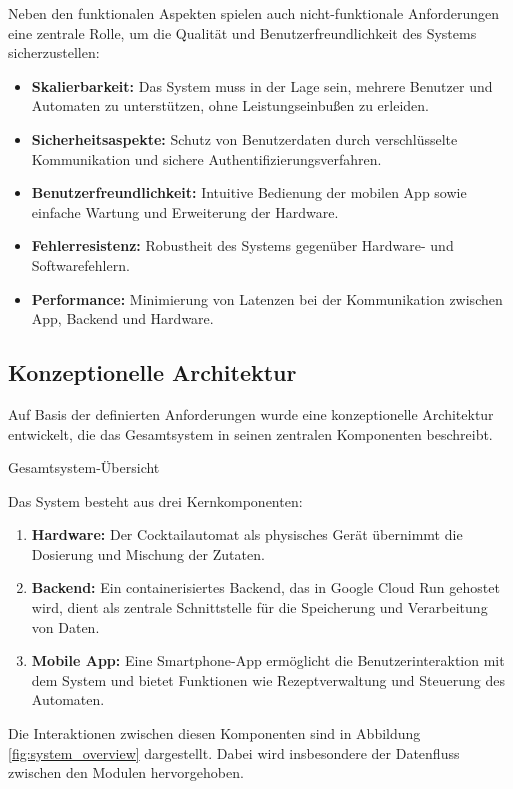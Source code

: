 Neben den funktionalen Aspekten spielen auch nicht-funktionale Anforderungen eine zentrale Rolle, 
um die Qualität und Benutzerfreundlichkeit des Systems sicherzustellen:

\begin{itemize}
	  \item	\textbf{Skalierbarkeit:} Das System muss in der Lage sein, mehrere Benutzer und Automaten zu unterstützen, ohne Leistungseinbußen zu erleiden.
	  \item	\textbf{Sicherheitsaspekte:} Schutz von Benutzerdaten durch verschlüsselte Kommunikation und sichere Authentifizierungsverfahren.
	  \item	\textbf{Benutzerfreundlichkeit:} Intuitive Bedienung der mobilen App sowie einfache Wartung und Erweiterung der Hardware.
	  \item	\textbf{Fehlerresistenz:} Robustheit des Systems gegenüber Hardware- und Softwarefehlern.
	  \item	\textbf{Performance:} Minimierung von Latenzen bei der Kommunikation zwischen App, Backend und Hardware.
\end{itemize}

\subsection{Konzeptionelle Architektur}

Auf Basis der definierten Anforderungen wurde eine konzeptionelle Architektur entwickelt, die das 
Gesamtsystem in seinen zentralen Komponenten beschreibt.

Gesamtsystem-Übersicht

Das System besteht aus drei Kernkomponenten:

\begin{enumerate}
  \item \textbf{Hardware:} Der Cocktailautomat als physisches Gerät übernimmt die Dosierung und Mischung der Zutaten.
  \item \textbf{Backend:} Ein containerisiertes Backend, das in Google Cloud Run gehostet wird, dient als zentrale Schnittstelle für die Speicherung und Verarbeitung von Daten.
  \item \textbf{Mobile App:} Eine Smartphone-App ermöglicht die Benutzerinteraktion mit dem System und bietet Funktionen wie Rezeptverwaltung und Steuerung des Automaten.
\end{enumerate}

Die Interaktionen zwischen diesen Komponenten sind in Abbildung \ref{fig:system_overview} 
dargestellt. Dabei wird insbesondere der Datenfluss zwischen den Modulen hervorgehoben.

